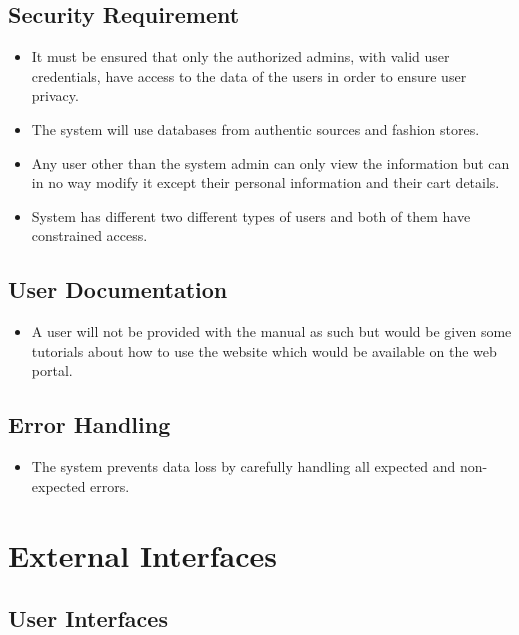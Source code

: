 \subsection{Security Requirement}
\begin{itemize}
    \item It must be ensured that only the authorized admins, with valid user credentials, have access to the data of the users in order to ensure user privacy. 
    
    \item The system will use databases from authentic sources and fashion stores.
    
    \item Any user other than the system admin can only view the information but can in no  way modify it except their personal information and their cart details.
    
    \item System has different two different types of users and both of them have constrained access. 
\end{itemize}

\subsection{User Documentation}
\begin{itemize}
    \item A user will not be provided with the manual as such but would be given some tutorials about how to use the website which would be available on the web portal. 
\end{itemize}

\subsection{Error Handling}
\begin{itemize}
    \item The system prevents data loss by carefully handling all expected and non-expected errors. 
\end{itemize}

\section{External Interfaces}

\subsection{User Interfaces}

